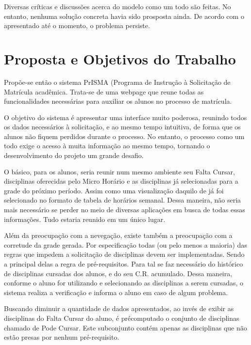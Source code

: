 \documentclass[graduacao,brazil]{ThesisPUC}
\begin{document}
Diversas críticas e discussões acerca do modelo como um todo são feitas. No entanto, nenhuma solução concreta havia sido prosposta ainda. De acordo com o apresentado até o momento, o problema persiste.


\chapter{Proposta e Objetivos do Trabalho}

Propõe-se então o sistema PrISMA (Programa de Instrução à Solicitação de Matrícula acadêmica. Trata-se de uma webpage que reune todas as funcionalidades necessárias para auxiliar os alunos no processo de matrícula.

O objetivo do sistema é apresentar uma interface muito poderosa, reunindo todos os dados necessários à solicitação, e ao mesmo tempo intuitiva, de forma que os alunos não fiquem perdidos durante o processo. No entanto, o processo como um todo exige o acesso à muita informação ao mesmo tempo, tornando o desenvolvimento do projeto um grande desafio.

O básico, para os alunos, seria reunir num mesmo ambiente seu Falta Cursar, disciplinas oferecidas pelo Micro Horário e as disciplinas já selecionadas para a grade do próximo período. Assim como uma visualização daquilo de já foi selecionado no formato de tabela de horários semanal. Dessa maneira, não seria mais necessário se perder no meio de diversas aplicações em busca de todas essas informações. Tudo estaria reunido em um único lugar.

Além da preocupação com a nevegação, existe também a preocupação com a corretude da grade gerada. Por especificação todas (ou pelo menos a maioria) das regras que impedem a solicitação de disciplinas devem ser implementadas. Sendo a principal delas a regra de pré-requisitos. Para tal se faz necessário do histórico de disciplinas cursadas dos alunos, e do seu C.R. acumulado. Dessa maneira, conforme o aluno for utilizando e selecionando as disciplinas a serem cursadas, o sistema realiza a verificação e informa o aluno em caso de algum problema.

Buscando diminuir a quantidade de dados apresentados, ao invés de exibir as disciplinas do Falta Cursar do aluno, é précomputado o conjunto de disciplinas chamado de Pode Cursar. Este subconjunto contém apenas as disciplinas que não estão presas por nenhum pré-requisito. 
\end{document}
